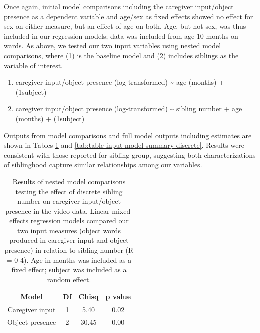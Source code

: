 \documentclass[
  man,mask,floatsintext]{apa6}
\providecommand{\tightlist}{%
  \setlength{\itemsep}{0pt}\setlength{\parskip}{0pt}}
\begin{document}
Once again, initial model comparisons including the caregiver input/object presence as a dependent variable and age/sex as fixed effects showed no effect for sex on either measure, but an effect of age on both. Age, but not sex, was thus included in our regression models; data was included from age 10 months on-wards. As above, we tested our two input variables using nested model comparisons, where (1) is the baseline model and (2) includes siblings as the variable of interest.

\begin{enumerate}
\def\labelenumi{\arabic{enumi}.}
\tightlist
\item
  caregiver input/object presence (log-transformed) \textasciitilde{} age (months) + (1\textbar subject)
\item
  caregiver input/object presence (log-transformed) \textasciitilde{} sibling number + age (months) + (1\textbar subject)
\end{enumerate}

Outputs from model comparisons and full model outputs including estimates are shown in Tables \ref{tab:table-model-comparisons-discrete} and \ref{tab:table-input-model-summary-discrete}. Results were consistent with those reported for sibling group, suggesting both characterizations of siblinghood capture similar relationships among our variables.

\begin{longtable}[t]{cccc}
\caption{\label{tab:table-model-comparisons-discrete}Results of nested model comparisons testing the effect of discrete sibling number on caregiver input/object presence in the video data. Linear mixed-effects regression models compared our two input measures (object words produced in caregiver input  and object presence) in relation to sibling number (R = 0-4). Age in months was included as a fixed effect; subject was included as a random effect.}\\
\toprule
Model & Df & Chisq & p value\\
\midrule
Caregiver input & 1 & 5.40 & 0.02\\
Object presence & 2 & 30.45 & 0.00\\
\bottomrule
\end{longtable}
\end{document}
